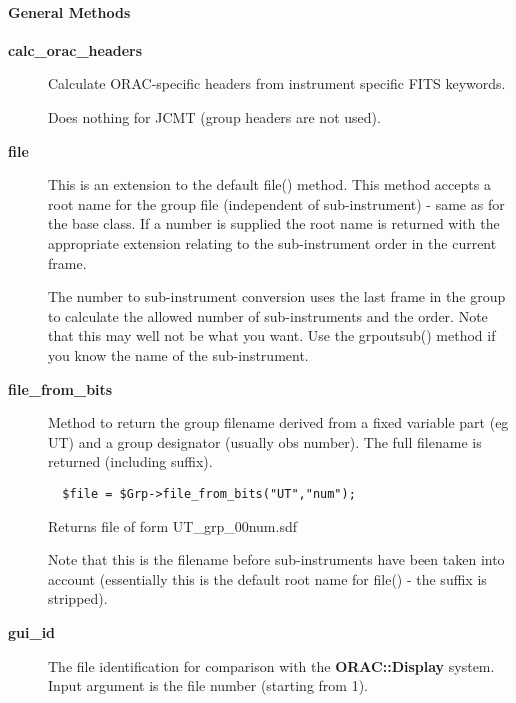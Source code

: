 \paragraph*{General Methods\label{ORAC::Group::JCMT_General_Methods}}
\begin{description}

\item[\textbf{calc\_orac\_headers}] \mbox{}

Calculate ORAC-specific headers from instrument specific FITS 
keywords.



Does nothing for JCMT (group headers are not used).


\item[\textbf{file}] \mbox{}

This is an extension to the default file() method.
This method accepts a root name for the group file
(independent of sub-instrument) - same as for the base 
class. If a number is supplied the root name is returned
with the appropriate extension relating to the 
sub-instrument order in the current frame.



The number to sub-instrument conversion uses the last frame in the
group to calculate the allowed number of sub-instruments and
the order. Note that this may well not be what you want.
Use the grpoutsub() method if you know the name of the sub-instrument.


\item[\textbf{file\_from\_bits}] \mbox{}

Method to return the group filename derived from a fixed
variable part (eg UT) and a group designator (usually obs
number). The full filename is returned (including suffix).

\begin{verbatim}
  $file = $Grp->file_from_bits("UT","num");
\end{verbatim}


Returns file of form UT\_grp\_00num.sdf



Note that this is the filename before sub-instruments
have been taken into account (essentially this is the
default root name for file() - the suffix is stripped).


\item[\textbf{gui\_id}] \mbox{}

The file identification for comparison with the \textbf{ORAC::Display}
system. Input argument is the file number (starting from 1).




\end{description}
